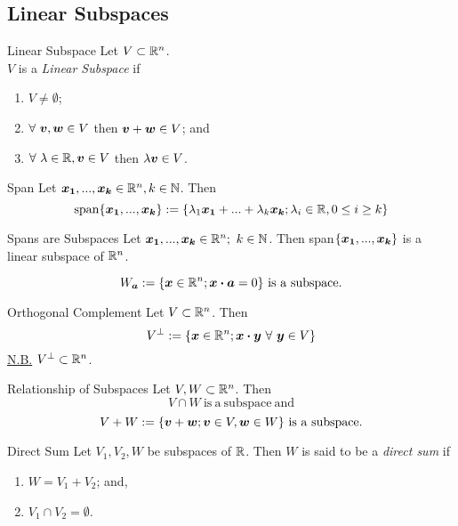 \documentclass[11pt,a4paper]{article}
\begin{document}
\subsection{Linear Subspaces}

\subtitle{Definition 2.11 - }{Linear Subspace}
Let $V \subset \mathbb{R}^n$.\\
$V$ is a \textit{Linear Subspace} if
\begin{enumerate}[label=\roman*)]
  \item $V \not = \emptyset$;
  \item $\forall\ \boldsymbol{v}, \boldsymbol{w} \in V$ then $\boldsymbol{v} + \boldsymbol{w} \in V$; and
  \item $\forall\ \lambda \in \mathbb{R}, \boldsymbol{v} \in V$ then $\lambda\boldsymbol{v} \in V$.\\
\end{enumerate}

\subtitle{Definition 2.12 - }{Span}
Let $\boldsymbol{x_1}, ... , \boldsymbol{x_k} \in \mathbb{R}^n, k \in \mathbb{N}$. Then
$$\mathrm{span}\{\boldsymbol{x_1}, ... , \boldsymbol{x_k}\} := \{\lambda_1\boldsymbol{x_1} + ... + \lambda_k\boldsymbol{x_k}; \lambda_i \in \mathbb{R}, 0 \leq i \geq k\}$$

\subtitle{Theorem 2.13 - }{Spans are Subspaces}
Let $\boldsymbol{x_1}, ... , \boldsymbol{x_k} \in \mathbb{R}^n;\ k \in \mathbb{N}$. Then span$\{\boldsymbol{x_1}, ... , \boldsymbol{x_k}\}$ is a linear subspace of $\mathbb{R}^n$. \\

\subtitle{Theorem 2.14}{}
$$W_{\boldsymbol{a}} := \{\boldsymbol{x} \in \mathbb{R}^n; \boldsymbol{x} \boldsymbol{\cdot} \boldsymbol{a} = 0\}\mathrm{\ is\ a\ subspace.}$$

\subtitle{Definition 2.15 - }{Orthogonal Complement}
Let $V \subset \mathbb{R}^n$. Then
$$V^{\perp} := \{\boldsymbol{x} \in \mathbb{R}^n; \boldsymbol{x} \boldsymbol{\cdot} \boldsymbol{y}\ \forall\ \boldsymbol{y} \in V\}$$
\underline{N.B.} $V^{\perp} \subset \mathbb{R}^n$.\\

\subtitle{Theorem 2.16 - }{Relationship of Subspaces}
Let $V, W \subset \mathbb{R}^n$. Then
$$V \cap W \mathrm{\ is\ a\ subspace\ and}$$
$$V+W := \{\boldsymbol{v} + \boldsymbol{w}; \boldsymbol{v} \in V, \boldsymbol{w} \in W\}\mathrm{\ is\ a\ subspace.}$$

\subtitle{Definition 2.17 - }{Direct Sum}
Let $V_1, V_2, W$ be subspaces of $\mathbb{R}$. Then $W$ is said to be a \textit{direct sum} if
\begin{enumerate}[label=\roman*)]
  \item $W = V_1 + V_2$; and,
  \item $V_1 \cap V_2 = \emptyset$.
\end{enumerate}
\end{document}
